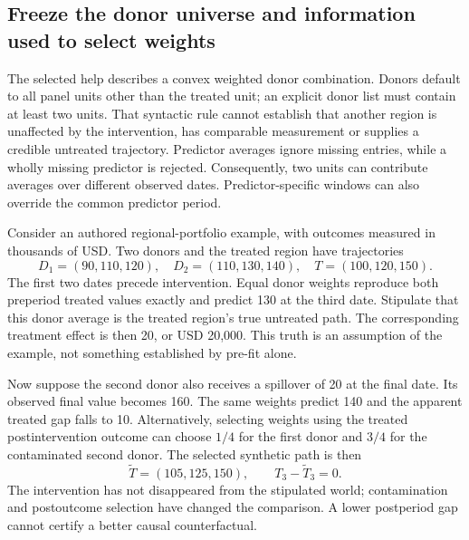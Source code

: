 \subsection{Freeze the donor universe and information used to select weights}
\label{exec19:synth-donors}

The selected help describes a convex weighted donor combination. Donors default
to all panel units other than the treated unit; an explicit donor list must
contain at least two units. That syntactic rule cannot establish that another
region is unaffected by the intervention, has comparable measurement or supplies
a credible untreated trajectory. Predictor averages ignore missing entries,
while a wholly missing predictor is rejected. Consequently, two units can
contribute averages over different observed dates. Predictor-specific windows
can also override the common predictor period.~\citep{exec19_synth_stata_source}

Consider an authored regional-portfolio example, with outcomes measured in
thousands of USD. Two donors and the treated region have trajectories
\begin{equation}
 D_1=(90,110,120),\quad D_2=(110,130,140),\quad T=(100,120,150).
 \label{exec19:synth-paths}
\end{equation}
The first two dates precede intervention. Equal donor weights reproduce both
preperiod treated values exactly and predict 130 at the third date. Stipulate
that this donor average is the treated region's true untreated path. The
corresponding treatment effect is then 20, or USD 20,000. This truth is an
assumption of the example, not something established by pre-fit alone.
\citep{exec19_synth_contract_reference}

Now suppose the second donor also receives a spillover of 20 at the final date.
Its observed final value becomes 160. The same weights predict 140 and the
apparent treated gap falls to 10. Alternatively, selecting weights using the
treated postintervention outcome can choose $1/4$ for the first donor and $3/4$
for the contaminated second donor. The selected synthetic path is then
\begin{equation}
 \widetilde T=(105,125,150),\qquad T_3-\widetilde T_3=0.
 \label{exec19:synth-leakage}
\end{equation}
The intervention has not disappeared from the stipulated world; contamination
and postoutcome selection have changed the comparison. A lower postperiod gap
cannot certify a better causal counterfactual.~\citep{exec19_synth_contract_reference}

